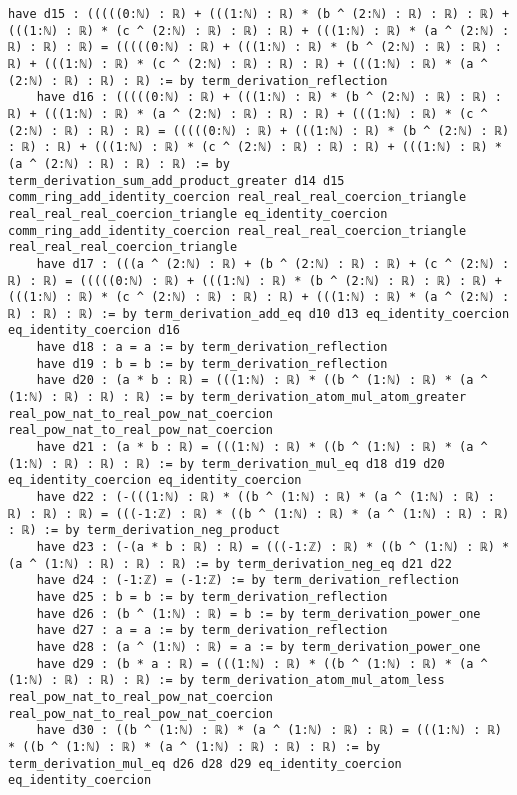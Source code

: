 \documentclass{article}
\begin{document}
\begin{tcolorbox}[colback=white!10, width=\linewidth]
\begin{lstlisting}[language=Lean4]
    have d15 : (((((0:ℕ) : ℝ) + (((1:ℕ) : ℝ) * (b ^ (2:ℕ) : ℝ) : ℝ) : ℝ) + (((1:ℕ) : ℝ) * (c ^ (2:ℕ) : ℝ) : ℝ) : ℝ) + (((1:ℕ) : ℝ) * (a ^ (2:ℕ) : ℝ) : ℝ) : ℝ) = (((((0:ℕ) : ℝ) + (((1:ℕ) : ℝ) * (b ^ (2:ℕ) : ℝ) : ℝ) : ℝ) + (((1:ℕ) : ℝ) * (c ^ (2:ℕ) : ℝ) : ℝ) : ℝ) + (((1:ℕ) : ℝ) * (a ^ (2:ℕ) : ℝ) : ℝ) : ℝ) := by term_derivation_reflection
    have d16 : (((((0:ℕ) : ℝ) + (((1:ℕ) : ℝ) * (b ^ (2:ℕ) : ℝ) : ℝ) : ℝ) + (((1:ℕ) : ℝ) * (a ^ (2:ℕ) : ℝ) : ℝ) : ℝ) + (((1:ℕ) : ℝ) * (c ^ (2:ℕ) : ℝ) : ℝ) : ℝ) = (((((0:ℕ) : ℝ) + (((1:ℕ) : ℝ) * (b ^ (2:ℕ) : ℝ) : ℝ) : ℝ) + (((1:ℕ) : ℝ) * (c ^ (2:ℕ) : ℝ) : ℝ) : ℝ) + (((1:ℕ) : ℝ) * (a ^ (2:ℕ) : ℝ) : ℝ) : ℝ) := by term_derivation_sum_add_product_greater d14 d15 comm_ring_add_identity_coercion real_real_real_coercion_triangle real_real_real_coercion_triangle eq_identity_coercion comm_ring_add_identity_coercion real_real_real_coercion_triangle real_real_real_coercion_triangle
    have d17 : (((a ^ (2:ℕ) : ℝ) + (b ^ (2:ℕ) : ℝ) : ℝ) + (c ^ (2:ℕ) : ℝ) : ℝ) = (((((0:ℕ) : ℝ) + (((1:ℕ) : ℝ) * (b ^ (2:ℕ) : ℝ) : ℝ) : ℝ) + (((1:ℕ) : ℝ) * (c ^ (2:ℕ) : ℝ) : ℝ) : ℝ) + (((1:ℕ) : ℝ) * (a ^ (2:ℕ) : ℝ) : ℝ) : ℝ) := by term_derivation_add_eq d10 d13 eq_identity_coercion eq_identity_coercion d16
    have d18 : a = a := by term_derivation_reflection
    have d19 : b = b := by term_derivation_reflection
    have d20 : (a * b : ℝ) = (((1:ℕ) : ℝ) * ((b ^ (1:ℕ) : ℝ) * (a ^ (1:ℕ) : ℝ) : ℝ) : ℝ) := by term_derivation_atom_mul_atom_greater real_pow_nat_to_real_pow_nat_coercion real_pow_nat_to_real_pow_nat_coercion
    have d21 : (a * b : ℝ) = (((1:ℕ) : ℝ) * ((b ^ (1:ℕ) : ℝ) * (a ^ (1:ℕ) : ℝ) : ℝ) : ℝ) := by term_derivation_mul_eq d18 d19 d20 eq_identity_coercion eq_identity_coercion
    have d22 : (-(((1:ℕ) : ℝ) * ((b ^ (1:ℕ) : ℝ) * (a ^ (1:ℕ) : ℝ) : ℝ) : ℝ) : ℝ) = (((-1:ℤ) : ℝ) * ((b ^ (1:ℕ) : ℝ) * (a ^ (1:ℕ) : ℝ) : ℝ) : ℝ) := by term_derivation_neg_product
    have d23 : (-(a * b : ℝ) : ℝ) = (((-1:ℤ) : ℝ) * ((b ^ (1:ℕ) : ℝ) * (a ^ (1:ℕ) : ℝ) : ℝ) : ℝ) := by term_derivation_neg_eq d21 d22
    have d24 : (-1:ℤ) = (-1:ℤ) := by term_derivation_reflection
    have d25 : b = b := by term_derivation_reflection
    have d26 : (b ^ (1:ℕ) : ℝ) = b := by term_derivation_power_one
    have d27 : a = a := by term_derivation_reflection
    have d28 : (a ^ (1:ℕ) : ℝ) = a := by term_derivation_power_one
    have d29 : (b * a : ℝ) = (((1:ℕ) : ℝ) * ((b ^ (1:ℕ) : ℝ) * (a ^ (1:ℕ) : ℝ) : ℝ) : ℝ) := by term_derivation_atom_mul_atom_less real_pow_nat_to_real_pow_nat_coercion real_pow_nat_to_real_pow_nat_coercion
    have d30 : ((b ^ (1:ℕ) : ℝ) * (a ^ (1:ℕ) : ℝ) : ℝ) = (((1:ℕ) : ℝ) * ((b ^ (1:ℕ) : ℝ) * (a ^ (1:ℕ) : ℝ) : ℝ) : ℝ) := by term_derivation_mul_eq d26 d28 d29 eq_identity_coercion eq_identity_coercion

\end{lstlisting}
\end{tcolorbox}
\end{document}
